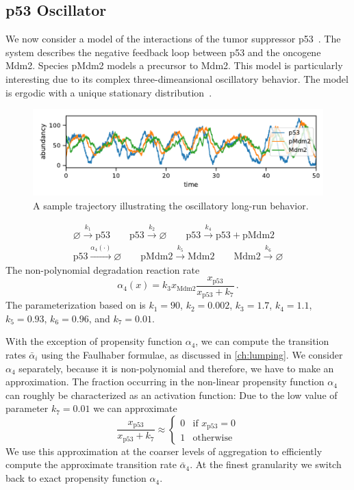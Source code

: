 \subsection{p53 Oscillator}
We now consider a model of the interactions of the tumor suppressor p53~\parencite{geva2006oscillations}. The system describes the negative feedback loop between  p53 and the oncogene Mdm2.
Species pMdm2 models a precursor to Mdm2. This model is particularly interesting due to its complex three-di\-mea\-nsional oscillatory behavior.
The model is ergodic with a unique stationary distribution~\parencite{gupta2014scalable}.
\begin{figure}[htb]
    \centering
    \includegraphics[width=\textwidth]{gfx/p53_traj.pdf}
    \caption{A sample trajectory illustrating the oscillatory long-run behavior. }
    \label{fig:p53:traj}
\end{figure}
\begin{model}[p53 Oscillator]\label{model:p53}
\begin{align*}
\varnothing \xrightarrow{k_1} \mathrm{p53} \qquad
\mathrm{p53} \xrightarrow{k_2} \varnothing \qquad
\mathrm{p53} \xrightarrow{k_4} \mathrm{p53} + \mathrm{pMdm2}
\\
\mathrm{p53} \xrightarrow{\alpha_4(\cdot)} \varnothing \qquad
\mathrm{pMdm2} \xrightarrow{k_5} \mathrm{Mdm2} \qquad
\mathrm{Mdm2} \xrightarrow{k_6} \varnothing
\end{align*}
The non-polynomial degradation reaction rate
	\[
\alpha_4(x) =k_3 x_{\mathrm{Mdm2}} \frac{x_{\mathrm{p53}}}{x_{\mathrm{p53}} + k_7}\,.
\]
The parameterization based on \parencite{ale2013general} is $k_1=90$, $k_2=0.002$, $k_3=1.7$, $k_4=1.1$, $k_5=0.93$, $k_6=0.96$, and $k_7 = 0.01$.
\end{model}
With the exception of propensity function $\alpha_4$, we can compute the transition rates $\bar{\alpha}_i$ using the Faulhaber formulae, as discussed in \autoref{ch:lumping}.
We consider $\alpha_4$ separately, because it is non-polynomial and therefore, we have to make an approximation.
The fraction occurring in the non-linear propensity function $\alpha_4$ can roughly be characterized as an activation function:
Due to the low value of parameter $k_7=0.01$ we can approximate
\[\frac{x_{\mathrm{p53}}}{x_{\mathrm{p53}} + k_7}
\approx
\begin{cases}
0 & \text{if } x_{\mathrm{p53}} = 0\\
1 & \text{otherwise}
\end{cases}
\]
We use this approximation at the coarser levels of aggregation to efficiently compute the approximate transition rate $\bar{\alpha}_4$.
At the finest granularity we switch back to exact propensity function $\alpha_4$.

